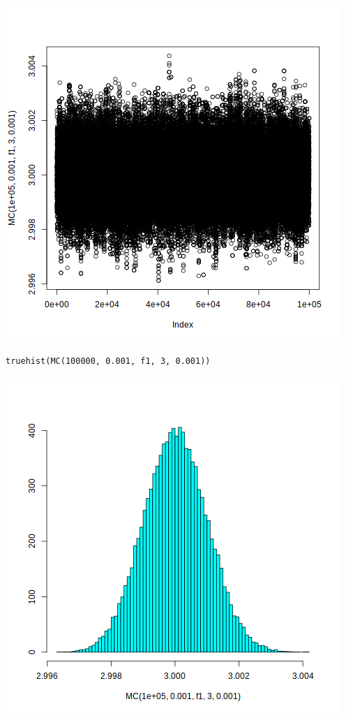 \documentclass[11pt]{article}
\begin{document}
\begin{center}
\includegraphics[width=.9\linewidth]{figy.png}
\end{center}

\begin{verbatim}
truehist(MC(100000, 0.001, f1, 3, 0.001))

\end{verbatim}

\begin{center}
\includegraphics[width=.9\linewidth]{hist2.png}
\end{center}
\end{document}
